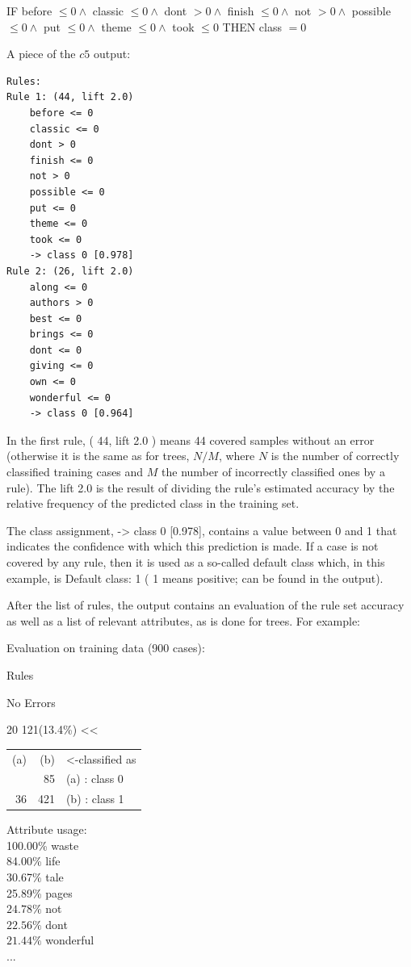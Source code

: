 \documentclass[10pt]{book}
\begin{document}
IF before $\leq 0 \wedge$ classic $\leq 0 \wedge$ dont $>0 \wedge$ finish $\leq 0 \wedge$ not $>0 \wedge$ possible $\leq 0 \wedge$ put $\leq 0 \wedge$ theme $\leq 0 \wedge$ took $\leq 0$ THEN class $=0$

A piece of the $c 5$ output:

\begin{verbatim}
Rules:
Rule 1: (44, lift 2.0)
    before <= 0
    classic <= 0
    dont > 0
    finish <= 0
    not > 0
    possible <= 0
    put <= 0
    theme <= 0
    took <= 0
    -> class 0 [0.978]
Rule 2: (26, lift 2.0)
    along <= 0
    authors > 0
    best <= 0
    brings <= 0
    dont <= 0
    giving <= 0
    own <= 0
    wonderful <= 0
    -> class 0 [0.964]
\end{verbatim}

In the first rule, ( 44, lift 2.0 ) means 44 covered samples without an error (otherwise it is the same as for trees, $N / M$, where $N$ is the number of correctly classified training cases and $M$ the number of incorrectly classified ones by a rule). The lift 2.0 is the result of dividing the rule's estimated accuracy by the relative frequency of the predicted class in the training set.

The class assignment, -> class 0 [0.978], contains a value between 0 and 1 that indicates the confidence with which this prediction is made. If a case is not covered by any rule, then it is used as a so-called default class which, in this example, is Default class: 1 ( 1 means positive; can be found in the output).

After the list of rules, the output contains an evaluation of the rule set accuracy as well as a list of relevant attributes, as is done for trees. For example:

Evaluation on training data (900 cases):

Rules

No Errors

20 121(13.4\%) <<

\begin{center}
\begin{tabular}{rrl}
(a) & (b) & <-classified as \\
\hdashline
358 & 85 & (a) : class 0 \\
36 & 421 & (b) : class 1 \\
\end{tabular}
\end{center}

Attribute usage:\\
100.00\% waste\\
84.00\% life\\
30.67\% tale\\
25.89\% pages\\
$24.78 \%$ not\\
$22.56 \%$ dont\\
$21.44 \%$ wonderful\\
...
\end{document}
